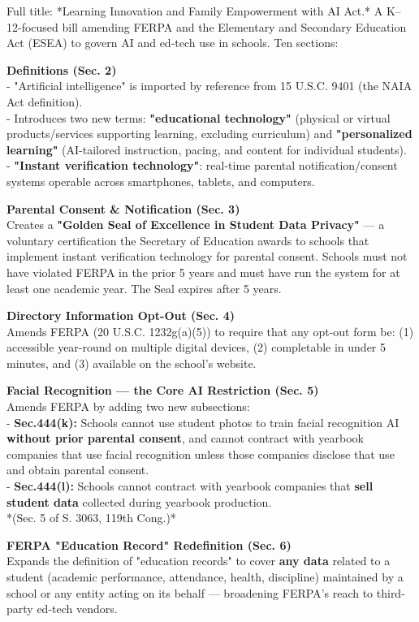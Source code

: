 \documentclass[11pt]{article}
\begin{document}
Full title: *Learning Innovation and Family Empowerment with AI Act.* A K--12-focused bill amending FERPA and the Elementary and Secondary Education Act (ESEA) to govern AI and ed-tech use in schools. Ten sections:

\textbf{Definitions (Sec. 2)} \\
- "Artificial intelligence" is imported by reference from 15 U.S.C. 9401 (the NAIA Act definition). \\
- Introduces two new terms: \textbf{"educational technology"} (physical or virtual products/services supporting learning, excluding curriculum) and \textbf{"personalized learning"} (AI-tailored instruction, pacing, and content for individual students). \\
- \textbf{"Instant verification technology"}: real-time parental notification/consent systems operable across smartphones, tablets, and computers.

\textbf{Parental Consent \& Notification (Sec. 3)} \\
Creates a \textbf{"Golden Seal of Excellence in Student Data Privacy"} --- a voluntary certification the Secretary of Education awards to schools that implement instant verification technology for parental consent. Schools must not have violated FERPA in the prior 5 years and must have run the system for at least one academic year. The Seal expires after 5 years.

\textbf{Directory Information Opt-Out (Sec. 4)} \\
Amends FERPA (20 U.S.C. 1232g(a)(5)) to require that any opt-out form be: (1) accessible year-round on multiple digital devices, (2) completable in under 5 minutes, and (3) available on the school's website.

\textbf{Facial Recognition --- the Core AI Restriction (Sec. 5)} \\
Amends FERPA by adding two new subsections: \\
- \textbf{Sec.444(k):} Schools cannot use student photos to train facial recognition AI \textbf{without prior parental consent}, and cannot contract with yearbook companies that use facial recognition unless those companies disclose that use and obtain parental consent. \\
- \textbf{Sec.444(l):} Schools cannot contract with yearbook companies that \textbf{sell student data} collected during yearbook production. \\
*(Sec. 5 of S. 3063, 119th Cong.)*

\textbf{FERPA "Education Record" Redefinition (Sec. 6)} \\
Expands the definition of "education records" to cover \textbf{any data} related to a student (academic performance, attendance, health, discipline) maintained by a school or any entity acting on its behalf --- broadening FERPA's reach to third-party ed-tech vendors.
\end{document}
